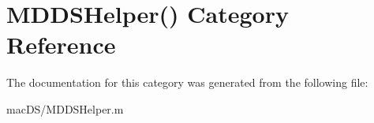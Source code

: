 \hypertarget{category_m_d_d_s_helper_07_08}{\section{M\-D\-D\-S\-Helper() Category Reference}
\label{category_m_d_d_s_helper_07_08}
}


The documentation for this category was generated from the following file\-:\begin{DoxyCompactItemize}
\item 
mac\-D\-S/M\-D\-D\-S\-Helper.\-m\end{DoxyCompactItemize}
